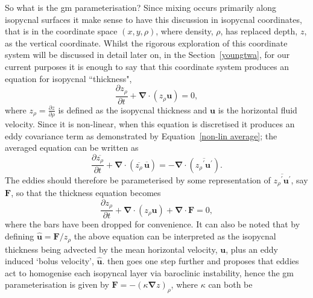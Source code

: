 \documentclass[12pt,a4paper]{report}
\newcommand*\mean[1]{\overline{#1}}
\newcommand*\res[1]{{#1}^{\prime}}
\newcommand*\equref[1]{Equation~\eqref{#1}}
\newcommand*\secref[1]{Section~\ref{#1}}
\begin{document}
 So what is the \gls{gm} parameterisation? Since mixing occurs primarily
 along isopycnal surfaces it make sense to have this discussion in
 isopycnal coordinates, that is in the coordinate space $(x,y,\rho)$,
  where density, $\rho$, has replaced depth, $z$, as the vertical
  coordinate. Whilst the rigorous exploration of this coordinate system
  will be discussed in detail later on, in the \secref{youngtwa}, for our current purposes 
  it is enough to say that this coordinate system produces an equation
  for isopycnal ``thickness",
  \begin{equation}
  \label{cont}
  \frac{\partial z_{\rho}}{\partial t} + \boldsymbol{\nabla}\cdot\left(z_{\rho}\boldsymbol{u}\right) = 0,
  \end{equation}
  where $z_{\rho} = \frac{\partial z}{\partial \rho}$ is defined as the
   isopycnal thickness and $\boldsymbol{u}$ is the horizontal fluid
   velocity. Since it is non-linear, when this equation is discretised
   it produces an eddy covariance term as demonstrated by 
   \equref{non-lin average}; the averaged equation can be written as
     \begin{equation}
     \frac{\partial \mean{z_{\rho}}}{\partial t} + \boldsymbol{\nabla}\cdot\left(\mean{z_{\rho}} \, \mean{\boldsymbol{u}}\right) = - \boldsymbol{\nabla}\cdot\left(\mean{\res{z_{\rho}} \res{\boldsymbol{u}}}\right).
     \label{meancont}
     \end{equation}
   The eddies should therefore be parameterised by some representation
   of $\mean{\res{z_{\rho}} \res{\boldsymbol{u}}}$, say $\boldsymbol{F}$,
   so that the thickness equation becomes
     \begin{equation}
     \frac{\partial z_{\rho}}{\partial t} + \boldsymbol{\nabla}\cdot\left(z_{\rho}\boldsymbol{u}\right) + \boldsymbol{\nabla}\cdot\boldsymbol{F} = 0,
     \label{thicknessgeneralparam}
     \end{equation}
    where the bars have been dropped for convenience. It can also 
    be noted that by defining $\hat{\boldsymbol{u}} = \boldsymbol{F}/z_{\rho}$ the above equation can be interpreted as
    the isopycnal thickness
    being advected by the mean horizontal velocity, $\boldsymbol{u}$, 
    plus an eddy induced
    `bolus velocity', $\hat{\boldsymbol{u}}$. \cite{gent1990} then goes one
    step further and proposes that eddies act to homogenise each
    isopyncal layer via baroclinic instability, hence the 
    \gls{gm} parameterisation is given by $\boldsymbol{F} = - \left(\kappa
    \boldsymbol{\nabla} z \right)_{\rho}$, where $\kappa$ can both be
\end{document}

